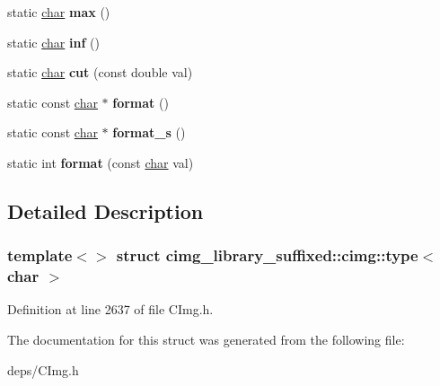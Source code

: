 \begin{DoxyCompactItemize}
static \hyperlink{classchar}{char} {\bfseries max} ()
\item 
\mbox{\label{structcimg__library__suffixed_1_1cimg_1_1type_3_01char_01_4_a0b66f27115dde4a55496a62c7241bccf}} 
static \hyperlink{classchar}{char} {\bfseries inf} ()
\item 
\mbox{\label{structcimg__library__suffixed_1_1cimg_1_1type_3_01char_01_4_a6d40e512f766ed9cbd2a17a82373dc97}} 
static \hyperlink{classchar}{char} {\bfseries cut} (const double val)
\item 
\mbox{\label{structcimg__library__suffixed_1_1cimg_1_1type_3_01char_01_4_aa07c136b2f9d4ff07c661e1d4f839b1f}} 
static const \hyperlink{classchar}{char} $\ast$ {\bfseries format} ()
\item 
\mbox{\label{structcimg__library__suffixed_1_1cimg_1_1type_3_01char_01_4_aedd4a0a8f6be80c76d90178e55ccd347}} 
static const \hyperlink{classchar}{char} $\ast$ {\bfseries format\+\_\+s} ()
\item 
\mbox{\label{structcimg__library__suffixed_1_1cimg_1_1type_3_01char_01_4_a978f9d0aeefee3e3437dea71c99c3db8}} 
static int {\bfseries format} (const \hyperlink{classchar}{char} val)
\end{DoxyCompactItemize}


\subsection{Detailed Description}
\subsubsection*{template$<$$>$\newline
struct cimg\+\_\+library\+\_\+suffixed\+::cimg\+::type$<$ char $>$}



Definition at line 2637 of file C\+Img.\+h.



The documentation for this struct was generated from the following file\+:\begin{DoxyCompactItemize}
\item 
deps/C\+Img.\+h\end{DoxyCompactItemize}
